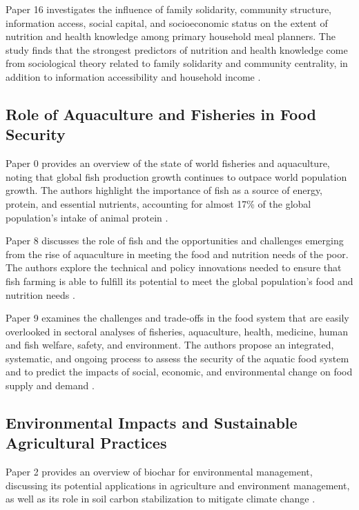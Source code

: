 \documentclass{article}
\begin{document}
Paper 16 investigates the influence of family solidarity, community structure, information access, social capital, and socioeconomic status on the extent of nutrition and health knowledge among primary household meal planners. The study finds that the strongest predictors of nutrition and health knowledge come from sociological theory related to family solidarity and community centrality, in addition to information accessibility and household income \cite{Choudhury2018TheAO}.

\subsection{Role of Aquaculture and Fisheries in Food Security}

Paper 0 provides an overview of the state of world fisheries and aquaculture, noting that global fish production growth continues to outpace world population growth. The authors highlight the importance of fish as a source of energy, protein, and essential nutrients, accounting for almost 17\% of the global population's intake of animal protein \cite{None}.

Paper 8 discusses the role of fish and the opportunities and challenges emerging from the rise of aquaculture in meeting the food and nutrition needs of the poor. The authors explore the technical and policy innovations needed to ensure that fish farming is able to fulfill its potential to meet the global population's food and nutrition needs \cite{Weiner2009TowardRO}.

Paper 9 examines the challenges and trade-offs in the food system that are easily overlooked in sectoral analyses of fisheries, aquaculture, health, medicine, human and fish welfare, safety, and environment. The authors propose an integrated, systematic, and ongoing process to assess the security of the aquatic food system and to predict the impacts of social, economic, and environmental change on food supply and demand \cite{Chung2016TheII}.

\subsection{Environmental Impacts and Sustainable Agricultural Practices}

Paper 2 provides an overview of biochar for environmental management, discussing its potential applications in agriculture and environment management, as well as its role in soil carbon stabilization to mitigate climate change \cite{Cesnik2001DigitalL}.
\end{document}
